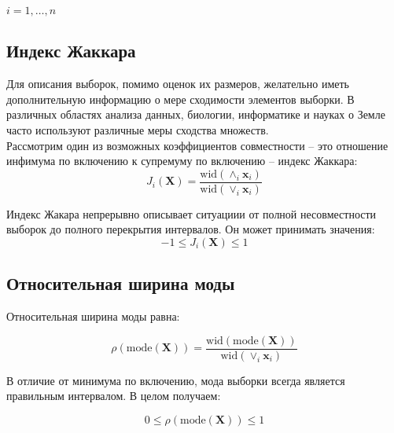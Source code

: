 \documentclass[./main.tex]{subfiles}
\begin{document}
$i = 1, \ldots, n$ \\

\subsection{Индекс Жаккара} 

Для описания выборок, помимо оценок их размеров, желательно иметь дополнительную информацию о мере сходимости элементов выборки. В различных областях анализа данных, биологии, информатике и науках о Земле часто используют различные меры сходства множеств. \\
Рассмотрим один из возможных коэффициентов совместности -- это отношение инфимума по включению к супремуму по включению -- индекс Жаккара: \\

\begin{equation}
	J_i(\bm{X}) = \dfrac{\text{wid}(\wedge_i \bm{x}_i)}{\text{wid} (\vee_i \bm{x}_i)}
\end{equation}

Индекс Жакара непрерывно описывает ситуациии от полной несовместности выборок до полного перекрытия интервалов. Он может принимать значения: 
\begin{equation*}
	-1 \leq J_i(\bm{X}) \leq 1
\end{equation*}

\subsection{Относительная ширина моды}

Относительная ширина моды равна: 

\begin{equation}
	\rho(\text{mode}(\bm{X})) =\dfrac{\text{wid}(\text{mode}(\bm{X}))}{\text{wid} (\vee_i \bm{x}_i)}
\end{equation}

В отличие от минимума по включению, мода выборки всегда является правильным интервалом. В целом получаем: 

\begin{equation*}
	0 \leq \rho(\text{mode}(\bm{X})) \leq 1
\end{equation*}

\newpage
\end{document}
